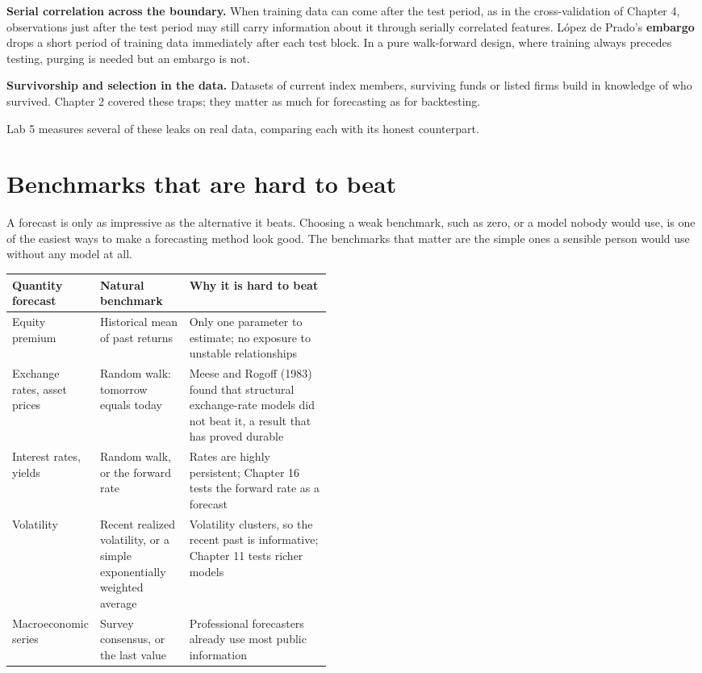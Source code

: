 \textbf{Serial correlation across the boundary.} When training data can come after the test period, as in the cross-validation of Chapter 4, observations just after the test period may still carry information about it through serially correlated features. L\'opez de Prado's \textbf{embargo} drops a short period of training data immediately after each test block. In a pure walk-forward design, where training always precedes testing, purging is needed but an embargo is not.

\textbf{Survivorship and selection in the data.} Datasets of current index members, surviving funds or listed firms build in knowledge of who survived. Chapter 2 covered these traps; they matter as much for forecasting as for backtesting.

Lab 5 measures several of these leaks on real data, comparing each with its honest counterpart.

\section{Benchmarks that are hard to beat}
\label{sec:05-benchmarks}

A forecast is only as impressive as the alternative it beats. Choosing a weak benchmark, such as zero, or a model nobody would use, is one of the easiest ways to make a forecasting method look good. The benchmarks that matter are the simple ones a sensible person would use without any model at all.

\begin{center}
\small
\begin{tabularx}{0.9\linewidth}{@{}>{\raggedright\arraybackslash}p{0.18\linewidth}>{\raggedright\arraybackslash}p{0.28\linewidth}>{\raggedright\arraybackslash}X@{}}
\toprule
Quantity forecast & Natural benchmark & Why it is hard to beat \\
\midrule
Equity premium & Historical mean of past returns & Only one parameter to estimate; no exposure to unstable relationships \\
Exchange rates, asset prices & Random walk: tomorrow equals today & Meese and Rogoff (1983) found that structural exchange-rate models did not beat it, a result that has proved durable \\
Interest rates, yields & Random walk, or the forward rate & Rates are highly persistent; Chapter 16 tests the forward rate as a forecast \\
Volatility & Recent realized volatility, or a simple exponentially weighted average & Volatility clusters, so the recent past is informative; Chapter 11 tests richer models \\
Macroeconomic series & Survey consensus, or the last value & Professional forecasters already use most public information \\
\bottomrule
\end{tabularx}
\end{center}

